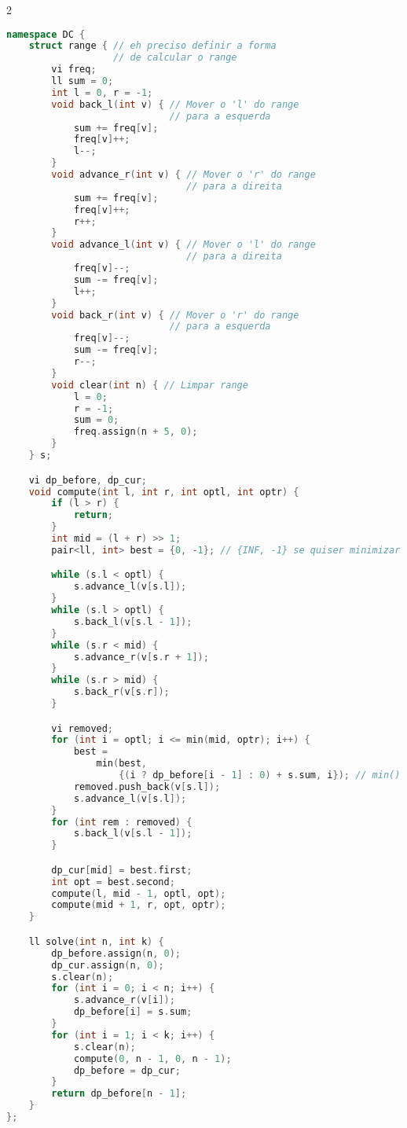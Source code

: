 \documentclass[11pt, a4paper, oneside]{book}
\begin{document}
\begin{multicols}{2}
\begin{lstlisting}[language=C++]
namespace DC {
    struct range { // eh preciso definir a forma
                   // de calcular o range
        vi freq;
        ll sum = 0;
        int l = 0, r = -1;
        void back_l(int v) { // Mover o 'l' do range
                             // para a esquerda
            sum += freq[v];
            freq[v]++;
            l--;
        }
        void advance_r(int v) { // Mover o 'r' do range
                                // para a direita
            sum += freq[v];
            freq[v]++;
            r++;
        }
        void advance_l(int v) { // Mover o 'l' do range
                                // para a direita
            freq[v]--;
            sum -= freq[v];
            l++;
        }
        void back_r(int v) { // Mover o 'r' do range
                             // para a esquerda
            freq[v]--;
            sum -= freq[v];
            r--;
        }
        void clear(int n) { // Limpar range
            l = 0;
            r = -1;
            sum = 0;
            freq.assign(n + 5, 0);
        }
    } s;

    vi dp_before, dp_cur;
    void compute(int l, int r, int optl, int optr) {
        if (l > r) {
            return;
        }
        int mid = (l + r) >> 1;
        pair<ll, int> best = {0, -1}; // {INF, -1} se quiser minimizar

        while (s.l < optl) {
            s.advance_l(v[s.l]);
        }
        while (s.l > optl) {
            s.back_l(v[s.l - 1]);
        }
        while (s.r < mid) {
            s.advance_r(v[s.r + 1]);
        }
        while (s.r > mid) {
            s.back_r(v[s.r]);
        }

        vi removed;
        for (int i = optl; i <= min(mid, optr); i++) {
            best =
                min(best,
                    {(i ? dp_before[i - 1] : 0) + s.sum, i}); // min() se quiser minimizar
            removed.push_back(v[s.l]);
            s.advance_l(v[s.l]);
        }
        for (int rem : removed) {
            s.back_l(v[s.l - 1]);
        }

        dp_cur[mid] = best.first;
        int opt = best.second;
        compute(l, mid - 1, optl, opt);
        compute(mid + 1, r, opt, optr);
    }

    ll solve(int n, int k) {
        dp_before.assign(n, 0);
        dp_cur.assign(n, 0);
        s.clear(n);
        for (int i = 0; i < n; i++) {
            s.advance_r(v[i]);
            dp_before[i] = s.sum;
        }
        for (int i = 1; i < k; i++) {
            s.clear(n);
            compute(0, n - 1, 0, n - 1);
            dp_before = dp_cur;
        }
        return dp_before[n - 1];
    }
};
\end{lstlisting}
\end{multicols}
\end{document}
